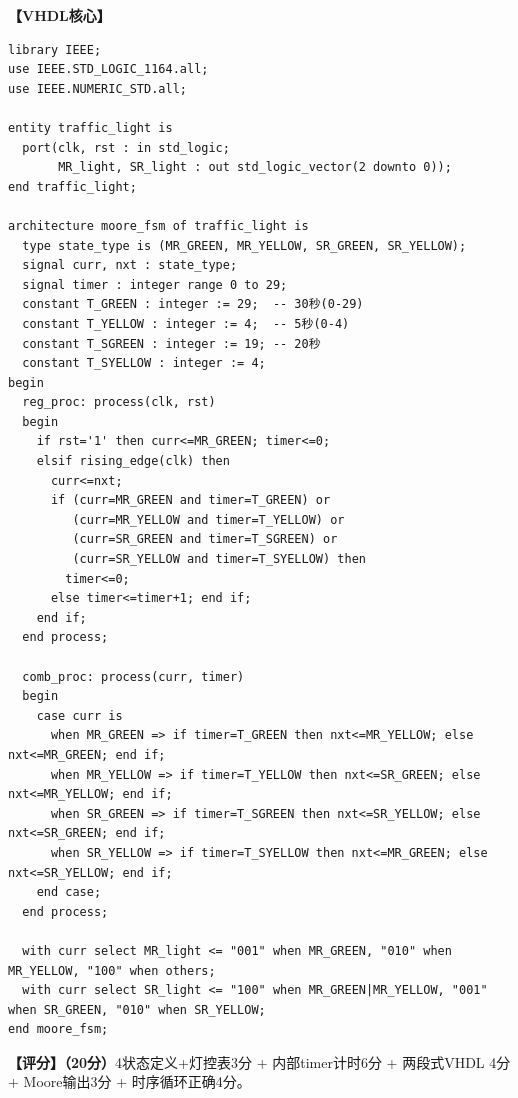 \textbf{【VHDL核心】}
\begin{lstlisting}
library IEEE;
use IEEE.STD_LOGIC_1164.all;
use IEEE.NUMERIC_STD.all;

entity traffic_light is
  port(clk, rst : in std_logic;
       MR_light, SR_light : out std_logic_vector(2 downto 0));
end traffic_light;

architecture moore_fsm of traffic_light is
  type state_type is (MR_GREEN, MR_YELLOW, SR_GREEN, SR_YELLOW);
  signal curr, nxt : state_type;
  signal timer : integer range 0 to 29;
  constant T_GREEN : integer := 29;  -- 30秒(0-29)
  constant T_YELLOW : integer := 4;  -- 5秒(0-4)
  constant T_SGREEN : integer := 19; -- 20秒
  constant T_SYELLOW : integer := 4;
begin
  reg_proc: process(clk, rst)
  begin
    if rst='1' then curr<=MR_GREEN; timer<=0;
    elsif rising_edge(clk) then
      curr<=nxt;
      if (curr=MR_GREEN and timer=T_GREEN) or
         (curr=MR_YELLOW and timer=T_YELLOW) or
         (curr=SR_GREEN and timer=T_SGREEN) or
         (curr=SR_YELLOW and timer=T_SYELLOW) then
        timer<=0;
      else timer<=timer+1; end if;
    end if;
  end process;

  comb_proc: process(curr, timer)
  begin
    case curr is
      when MR_GREEN => if timer=T_GREEN then nxt<=MR_YELLOW; else nxt<=MR_GREEN; end if;
      when MR_YELLOW => if timer=T_YELLOW then nxt<=SR_GREEN; else nxt<=MR_YELLOW; end if;
      when SR_GREEN => if timer=T_SGREEN then nxt<=SR_YELLOW; else nxt<=SR_GREEN; end if;
      when SR_YELLOW => if timer=T_SYELLOW then nxt<=MR_GREEN; else nxt<=SR_YELLOW; end if;
    end case;
  end process;

  with curr select MR_light <= "001" when MR_GREEN, "010" when MR_YELLOW, "100" when others;
  with curr select SR_light <= "100" when MR_GREEN|MR_YELLOW, "001" when SR_GREEN, "010" when SR_YELLOW;
end moore_fsm;
\end{lstlisting}

\textbf{【评分】（20分）}4状态定义+灯控表3分 + 内部timer计时6分 + 两段式VHDL 4分 + Moore输出3分 + 时序循环正确4分。
